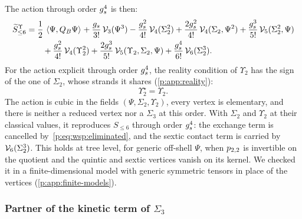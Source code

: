 The action through order $\gs^4$ is then:
  \begin{equation}
  \label{p:eq:wsp:action}
  \begin{aligned}
    \caction[\le 6]^{\Upsilon}
      &
      = \frac{1}{2} \, \pair{\Psi}{Q_B \Psi}
        + \frac{\gs}{3!} \, \vertex{3}(\Psi^3)
        - \frac{\gs^2}{4!} \, \vertex{4}(\Sigma_2^2)
        + \frac{2 \gs^2}{4!} \, \vertex{4}(\Sigma_2, \Psi^2)
        + \frac{\gs^3}{5!} \, \vertex{5}(\Sigma_2^2, \Psi)
      \\ &
      \qquad
        + \frac{\gs^2}{4!} \, \vertex{4}(\Upsilon_2^2)
        + \frac{2 \gs^3}{5!} \, \vertex{5}(\Upsilon_2, \Sigma_2, \Psi)
        + \frac{\gs^4}{6!} \, \vertex{6}(\Sigma_2^3).
  \end{aligned}
\end{equation}
  For the action explicit through order $\gs^4$, the reality condition of $\Upsilon_2$ has the sign of the one of $\Sigma_2$, whose strands it shares (\cref{p:app:reality}):
  \begin{equation}
  \Upsilon_2^\star
    = \Upsilon_2.
\end{equation}
  The action is cubic in the fields $(\Psi, \Sigma_2, \Upsilon_2)$, every vertex is elementary, and there is neither a reduced vertex nor a $\Sigma_3$ at this order.
  With $\Sigma_2$ and $\Upsilon_2$ at their classical values, it reproduces $S_{\le 6}$ through order $\gs^4$: the exchange term is cancelled by~\eqref{p:eq:wsp:eliminated}, and the sextic contact term is carried by $\vertex{6}(\Sigma_2^3)$.
  This holds at tree level, for generic off-shell $\Psi$, when $\sprod{2}{2}$ is invertible on the quotient and the quintic and sextic vertices vanish on its kernel.
  We checked it in a finite-dimensional model with generic symmetric tensors in place of the vertices (\cref{p:app:finite-models}).


\subsubsection{Partner of the kinetic term of \texorpdfstring{$\Sigma_3$}{Sigma3}}

